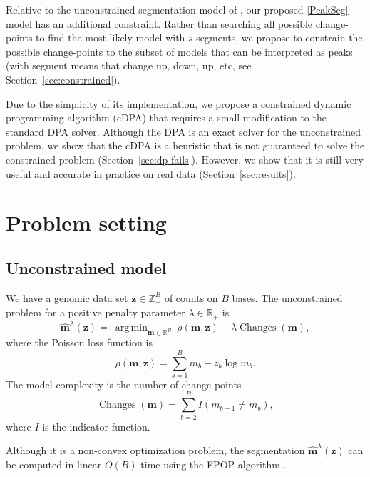 \documentclass{article}
\DeclareMathOperator*{\argmin}{arg\,min}
\DeclareMathOperator*{\Changes}{Changes}
\newcommand{\ZZ}{\mathbb Z}
\newcommand{\RR}{\mathbb R}
\begin{document}
Relative to the unconstrained segmentation model of \citet{Segmentor},
our proposed \ref{PeakSeg} model has an additional constraint. Rather
than searching all possible change-points to find the most likely
model with $s$ segments, we propose to constrain the possible
change-points to the subset of models that can be interpreted as peaks
(with segment means that change up, down, up, etc, see
Section~\ref{sec:constrained}).

Due to the simplicity of its implementation, we propose a constrained
dynamic programming algorithm (cDPA) that requires a small
modification to the standard DPA solver. Although the DPA is an exact
solver for the unconstrained problem, we show that the cDPA is a
heuristic that is not guaranteed to solve the constrained
problem (Section~\ref{sec:dp-fails}). However, we show that it is
still very useful and accurate in practice on real data
(Section~\ref{sec:results}).


\section{Problem setting}

\subsection{Unconstrained model}

We have a genomic data set $\mathbf{z}\in\ZZ_+^B$ of counts on $B$
bases. The unconstrained problem for a positive penalty parameter
$\lambda\in\RR_+$ is
\begin{equation}
  \label{unconstrained}
  \mathbf{\hat m}^\lambda(\mathbf z)  =\ 
  \argmin_{\mathbf m\in\RR^{B}}\ 
  \rho
  (\mathbf m, \mathbf z) 
  +\lambda\Changes(\mathbf m),
\end{equation}
where the Poisson loss function is
\begin{equation}\label{eq:rho}
  \rho(\mathbf m, \mathbf z)= \sum_{b=1}^B m_b - z_b \log m_b.
\end{equation} 
The model complexity is the number of change-points
\begin{equation}
  \Changes(\mathbf m)=\sum_{b=2}^B I(m_{b-1} \neq m_b),
\end{equation}
where $I$ is the indicator function.

Although it is a non-convex optimization problem, the segmentation
$\mathbf{\hat m}^\lambda(\mathbf z)$ can be computed in linear $O(B)$
time using the FPOP algorithm \citep{FPOP}.
\end{document}
